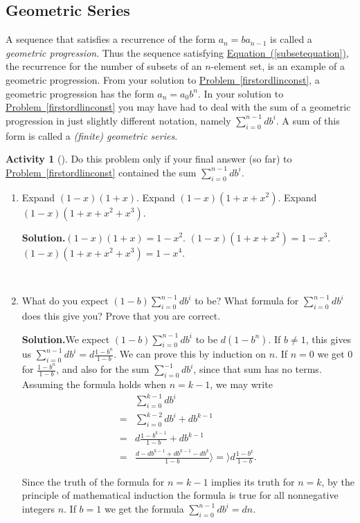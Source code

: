 \documentclass[10pt,]{book}
\theoremstyle{plain}
\theoremstyle{definition}
\newtheorem{activity}[project]{Activity}
\numberwithin{equation}{chapter}
\newcommand{\amp}{&}
\begin{document}
\subsection[{Geometric Series}]{Geometric Series}\label{subsection-20}
A sequence that satisfies a recurrence of the form \(a_n=ba_{n-1}\) is called a \emph{geometric progression}. Thus the sequence satisfying \hyperref[subsetequation]{Equation~(\ref{subsetequation})}, the recurrence for the number of subsets of an \(n\)-element set, is an example of a geometric progression. From your solution to \hyperref[firstordlinconst]{Problem~\ref{firstordlinconst}}, a geometric progression has the form \(a_n=a_0b^n\). In your solution to \hyperref[firstordlinconst]{Problem~\ref{firstordlinconst}} you may have had to deal with the sum of a geometric progression in just slightly different notation, namely \(\sum_{i=0}^{n-1}db^i\). A sum of this form is called a \emph{(finite) geometric series}.%
\begin{activity}[]\label{sumgeometricseries}
Do this problem only if your final answer (so far) to \hyperref[firstordlinconst]{Problem~\ref{firstordlinconst}} contained the sum \(\sum_{i=0}^{n-1}db^i\).%
~\par
\begin{enumerate}[label=(\alph*)]
 \item Expand \((1-x)(1+x)\).  Expand \((1-x)(1+x+x^2)\). Expand \((1-x)(1+x+x^2+x^3)\).%
\par\medskip\noindent%
\textbf{Solution.}\quad \((1-x)(1+x)=1-x^2\). \((1-x)(1+x+x^2)=1-x^3\). \((1-x)(1+x+x^2+x^3)=1-x^4\).%

~\par
\item What do you expect \((1-b)\sum_{i=0}^{n-1} db^i\) to be?  What formula for \(\sum_{i=0}^{n-1}db^i\) does this give you?  Prove that you are correct.%
\par\medskip\noindent%
\textbf{Solution.}\quad We expect \((1-b)\sum_{i=0}^{n-1} db^i\) to be \(d(1-b^n)\). If \(b\not=1\), this gives us \(\sum_{i=0}^{n-1}db^i=d\frac{1-b^n}{1-b}.\) We can prove this by induction on \(n\). If \(n=0\) we get 0 for \(\frac{1-b^n}{1-b}\), and also for the sum \(\sum_{i=0}^{-1}db^i\), since that sum has no terms. Assuming the formula holds when \(n=k-1\), we may write%
\begin{align*}
\amp \sum_{i=0}^{k-1} db^i\\
=\amp \sum_{i=0}^{k-2}db^i+db^{k-1}\\
=\amp d\frac{1-b^{k-1}}{1-b}+db^{k-1}\\
=\amp \frac{d-db^{k-1}  +db^{k-1}-db^k}{1-b}\rangle =\rangle  d\frac{1-b^k}{1-b}.
\end{align*}
%
\par
Since the truth of the formula for \(n=k-1\) implies its truth for \(n=k\), by the principle of mathematical induction the formula is true for all nonnegative integers \(n\). If \(b=1\) we get the formula \(\sum_{i=0}^{n-1}db^i=dn\).%

\end{enumerate}
\end{activity}
\end{document}
